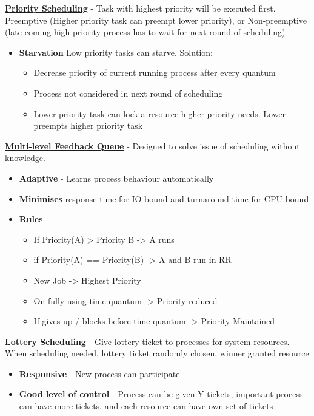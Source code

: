 \documentclass[10pt,landscape]{article}
\begin{document}
\begin{multicols*}{4}
  \underline{\textbf{Priority Scheduling}} - Task with highest priority will be executed first. Preemptive (Higher priority task can preempt lower priority), or Non-preemptive (late coming high priority process has to wait for next round of scheduling)
  \begin{itemize}
    \item \textbf{Starvation} Low priority tasks can starve. Solution:
      \begin{itemize}
        \item Decrease priority of current running process after every quantum
        \item Process not considered in next round of scheduling
        \item Lower priority task can lock a resource higher priority needs. Lower preempts higher priority task
      \end{itemize}
  \end{itemize}

  \underline{\textbf{Multi-level Feedback Queue}} - Designed to solve issue of scheduling without knowledge. 
  \begin{itemize}
    \item \textbf{Adaptive} - Learns process behaviour automatically
    \item \textbf{Minimises} response time for IO bound and turnaround time for CPU bound
    \item \textbf{Rules} 
      \begin{itemize}
        \item If Priority(A) > Priority B -> A runs
        \item if Priority(A) == Priority(B) -> A and B run in RR
        \item New Job -> Highest Priority
        \item On fully using time quantum -> Priority reduced
        \item If gives up / blocks before time quantum -> Priority Maintained
      \end{itemize}

  \end{itemize}

  \underline{\textbf{Lottery Scheduling}} - Give lottery ticket to processes for system resources. When scheduling needed, lottery ticket randomly chosen, winner granted resource
  \begin{itemize}
    \item \textbf{Responsive} - New process can participate
    \item \textbf{Good level of control} - Process can be given Y tickets, important process can have more tickets, and each resource can have own set of tickets
  \end{itemize}


\end{multicols*}
\end{document}
